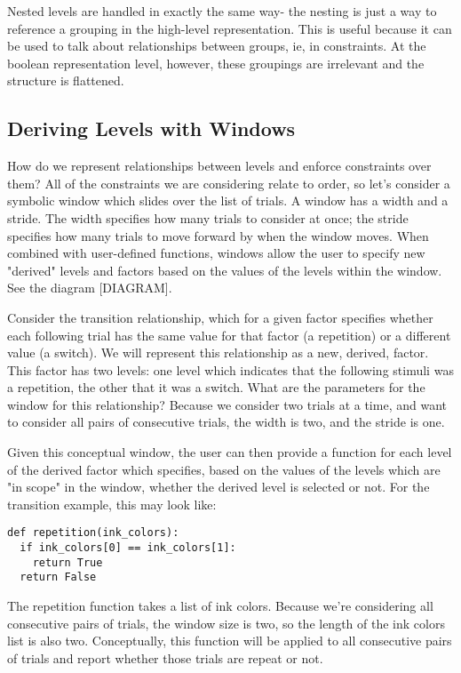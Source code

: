 Nested levels are handled in exactly the same way- the nesting is just a way to reference a grouping in the high-level representation. This is useful because it can be used to talk about relationships between groups, ie, in constraints. At the boolean representation level, however, these groupings are irrelevant and the structure is flattened.

\subsection{Deriving Levels with Windows}

How do we represent relationships between levels and enforce constraints over them? All of the constraints we are considering relate to order, so let's consider a symbolic window which slides over the list of trials. A window has a width and a stride. The width specifies how many trials to consider at once; the stride specifies how many trials to move forward by when the window moves. When combined with user-defined functions, windows allow the user to specify new "derived" levels and factors based on the values of the levels within the window. See the diagram [DIAGRAM].

Consider the transition relationship, which for a given factor specifies whether each following trial has the same value for that factor (a repetition) or a different value (a switch). We will represent this relationship as a new, derived, factor. This factor has two levels: one level which indicates that the following stimuli was a repetition, the other that it was a switch. What are the parameters for the window for this relationship? Because we consider two trials at a time, and want to consider all pairs of consecutive trials, the width is two, and the stride is one.

Given this conceptual window, the user can then provide a function for each level of the derived factor which specifies, based on the values of the levels which are "in scope" in the window, whether the derived level is selected or not. For the transition example, this may look like:

\begin{verbatim}
def repetition(ink_colors):
  if ink_colors[0] == ink_colors[1]:
    return True
  return False
\end{verbatim}

The repetition function takes a list of ink colors. Because we're considering all consecutive pairs of trials, the window size is two, so the length of the ink colors list is also two. Conceptually, this function will be applied to all consecutive pairs of trials and report whether those trials are repeat or not.

